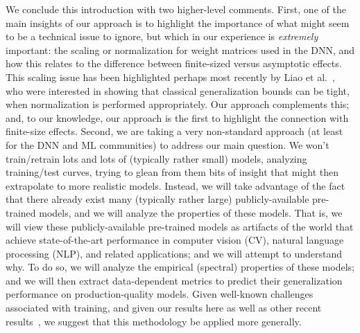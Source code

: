 We conclude this introduction with two higher-level comments.
%
First, 
one of the main insights of our approach is to highlight the importance of what might seem to be a technical issue to ignore, but which in our experience is \emph{extremely} important: the scaling or normalization for weight matrices used in the DNN, and how this relates to the difference between finite-sized versus asymptotic effects.
This scaling issue has been highlighted perhaps most recently by Liao et al.~\cite{LMBx18_TR}, who were interested in showing that classical generalization bounds can be tight, when normalization is performed appropriately.
Our approach complements this; and, to our knowledge, our approach is the first to highlight the connection with finite-size effects.
%
Second, 
we are taking a 
very %
non-standard approach (at least for the DNN and ML communities) to address our main question.
We won't train/retrain lots and lots of (typically rather small) models, analyzing training/test curves, trying to glean from them bits of insight that might then extrapolate to more realistic models.
Instead, we will take advantage of the fact that there already exist many (typically rather large) publicly-available pre-trained models, and we will analyze the properties of these models.
That is, we will view these publicly-available pre-trained models as artifacts of the world that achieve state-of-the-art performance in computer vision (CV), natural language processing (NLP), and related applications; and we will attempt to understand why.
To do so, we will analyze the empirical (spectral) properties of these models; 
and we will then extract data-dependent metrics to predict their generalization performance on production-quality models.
Given well-known challenges associated with training, and given our results here as well as other recent results~\cite{MM18_TR}, we suggest that this methodology be applied more generally.


